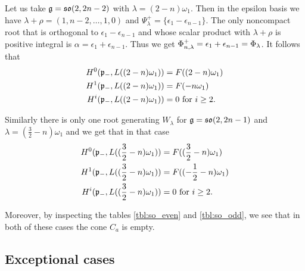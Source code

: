 \begin{example} 
 Let us take $\mathfrak{g} = \mathfrak{so}(2,2n-2)$ with $\lambda = (2-n)\omega_1$. Then in the epsilon basis we have $\lambda + \rho = (1,n-2,\ldots,1,0)$ and $\Psi_\lambda^+ = \{ \epsilon_1 - \epsilon_{n-1}\}$. The only noncompact root that is orthogonal to $\epsilon_1 -  \epsilon_{n-1}$ and whose scalar product with $\lambda + \rho$ is positive integral is $\alpha = \epsilon_1 + \epsilon_{n-1}$. Thus we get $\Phi_{n,\lambda}^+ = \epsilon_1 + \epsilon_{n-1} = \Phi_\lambda$. It follows that
\begin{align*}
 H^0(\mathfrak{p}_-,L((2-n)\omega_1)) &= F((2-n)\omega_1)\\
 H^1(\mathfrak{p}_-,L((2-n)\omega_1)) &= F(-n\omega_1)\\
 H^i(\mathfrak{p}_-,L((2-n)\omega_1)) &= 0 \text{ for } i\geq 2.
\end{align*} 

Similarly there is only one root generating $W_\lambda$ for $\mathfrak{g} = \mathfrak{so}(2,2n-1)$ and $\lambda = (\frac{3}{2} - n)\omega_1$ and we get that in that case
\begin{align*}
 H^0(\mathfrak{p}_-,L((\frac{3}{2}-n)\omega_1)) &= F((\frac{3}{2}-n)\omega_1)\\
 H^1(\mathfrak{p}_-,L((\frac{3}{2}-n)\omega_1)) &= F((-\frac{1}{2}-n)\omega_1)\\
 H^i(\mathfrak{p}_-,L((\frac{3}{2}-n)\omega_1)) &= 0 \text{ for } i\geq 2.
\end{align*}

Moreover, by inspecting the tables \ref{tbl:so_even} and \ref{tbl:so_odd}, we see that in both of these cases the cone $C_a$ is empty.
\end{example}


\clearpage



\clearpage

 

\clearpage



\clearpage



\clearpage



\clearpage
\subsection[Exceptional cases]{Exceptional cases}

